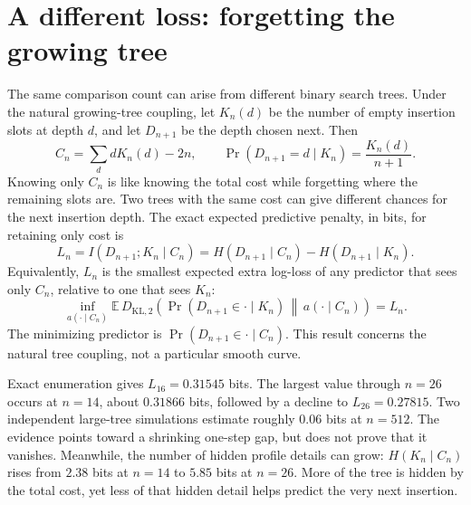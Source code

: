 \documentclass[10pt]{article}
\begin{document}
\newpage

\section*{A different loss: forgetting the growing tree}
The same comparison count can arise from different binary search trees.
Under the natural growing-tree coupling, let $K_n(d)$ be the number of empty
insertion slots at depth $d$, and let $D_{n+1}$ be the depth chosen next. Then
\begin{equation}
 C_n=\sum_d dK_n(d)-2n,
 \qquad \Pr(D_{n+1}=d\mid K_n)=\frac{K_n(d)}{n+1}.
 \label{eq:profile}
\end{equation}
Knowing only $C_n$ is like knowing the total cost while forgetting where the
remaining slots are. Two trees with the same cost can give different chances
for the next insertion depth. The exact expected predictive penalty, in bits,
for retaining only cost is
\begin{equation}
 L_n=I(D_{n+1};K_n\mid C_n)
 =H(D_{n+1}\mid C_n)-H(D_{n+1}\mid K_n).
 \label{eq:predictive}
\end{equation}
Equivalently, $L_n$ is the smallest expected extra log-loss of any predictor
that sees only $C_n$, relative to one that sees $K_n$:
\begin{equation}
 \inf_{a(\cdot\mid C_n)}
 \mathbb E\,D_{\mathrm{KL},2}\!
 \left(\Pr(D_{n+1}\in\cdot\mid K_n)\,\middle\|\,a(\cdot\mid C_n)\right)
 =L_n.
 \label{eq:optimalprediction}
\end{equation}
The minimizing predictor is $\Pr(D_{n+1}\in\cdot\mid C_n)$.
This result concerns the natural tree coupling, not a particular smooth curve.

Exact enumeration gives $L_{16}=0.31545$ bits. The largest value through
$n=26$ occurs at $n=14$, about $0.31866$ bits, followed by a decline to
$L_{26}=0.27815$. Two independent large-tree simulations estimate roughly
$0.06$ bits at $n=512$. The evidence points toward a shrinking one-step gap,
but does not prove that it vanishes. Meanwhile, the number of hidden profile
details can grow: $H(K_n\mid C_n)$ rises from $2.38$ bits at $n=14$ to
$5.85$ bits at $n=26$. More of the tree is hidden by the total cost, yet less
of that hidden detail helps predict the very next insertion.
\end{document}
